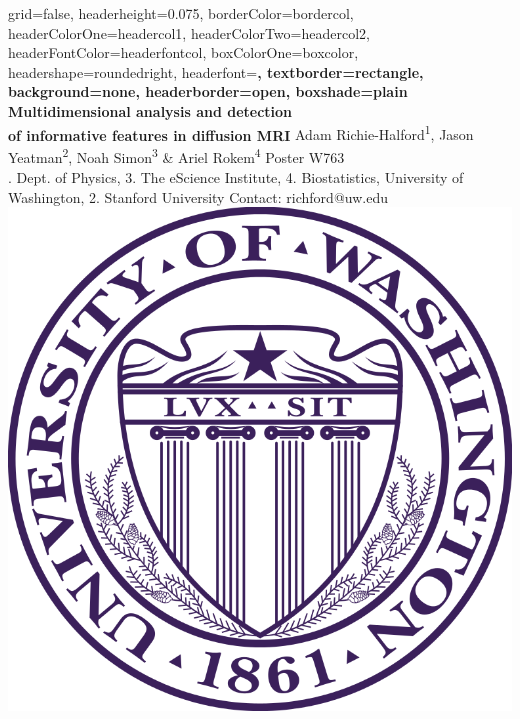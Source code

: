 \documentclass[a0paper,portrait,fontscale=0.395]{baposter}
\begin{document}
\begin{poster}{
grid=false,
headerheight=0.075\textheight,
borderColor=bordercol, %
headerColorOne=headercol1, %
headerColorTwo=headercol2, %
headerFontColor=headerfontcol, %
boxColorOne=boxcolor, %
headershape=roundedright, %
headerfont=\Large\sf\bf, %
textborder=rectangle,
background=none,
headerborder=open, %
boxshade=plain
}
{}
%
%
{\sf\bf Multidimensional analysis and detection \\ of informative features in diffusion MRI} %
{\vspace{0.5em} Adam Richie-Halford\textsuperscript{1}, Jason Yeatman\textsuperscript{2}, Noah Simon\textsuperscript{3} \& Ariel Rokem\textsuperscript{4} \hfill Poster W763 \hspace{0.5em}\null \\ %
{. Dept. of Physics, 3. The eScience Institute, 4. Biostatistics, University of Washington, 2. Stanford University \hfill Contact: richford@uw.edu \hspace{0.5em}\null}} %
{\includegraphics[scale=0.12]{UWlogo.png}} %
\vspace{-10em}


\end{poster}
\end{document}
